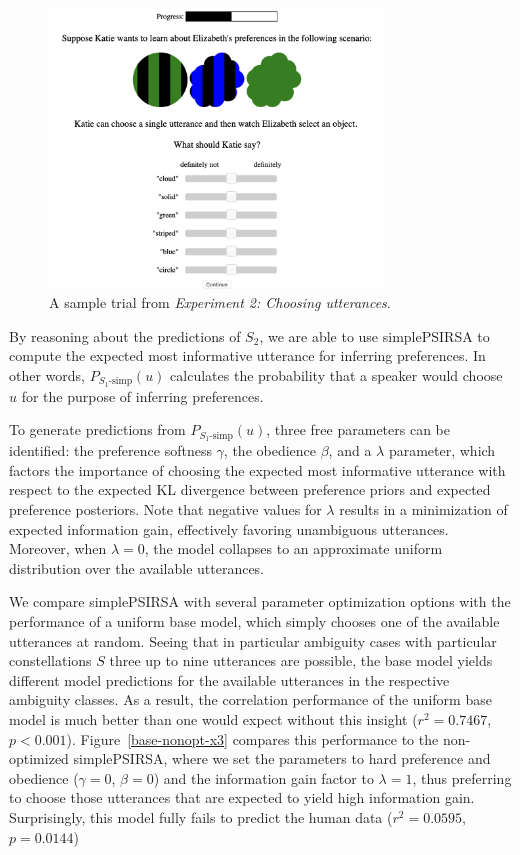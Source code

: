 \documentclass[10pt,a4paper]{article}
\newcommand{\gcs}[1]{\textcolor{blue}{[gcs: #1]}}
\begin{document}
\begin{figure}[ht]
	\centering
	\includegraphics[width=3.5in]{images/utterance-choice-trial.png}
	\caption{A sample trial from \emph{Experiment 2: Choosing utterances}. }\label{exp2-trial}
\end{figure} 

By reasoning about the predictions of $S_2$, we are able to use simplePSIRSA to compute the expected most informative utterance for inferring preferences.
In other words, $P_{S_1\textrm{-simp}}(u)$ calculates the probability that a speaker would choose $u$ for the purpose of inferring preferences.

To generate predictions from $P_{S_1\textrm{-simp}}(u)$, three free parameters can be identified:
the preference softness $\gamma$, the obedience $\beta$, and a $\lambda$ parameter, which factors the importance of choosing the expected most informative utterance with respect to the expected KL divergence between preference priors and expected preference posteriors.
Note that negative values for $\lambda$ results in a minimization of expected information gain, effectively favoring unambiguous utterances. 
Moreover, when $\lambda=0$, the model collapses to an approximate uniform distribution over the available utterances.



We compare simplePSIRSA with several parameter optimization options with the performance of a uniform base model, which simply chooses one of the available utterances at random. 
Seeing that in particular ambiguity cases with particular constellations $S$ three up to nine utterances are possible, the base model yields different model predictions for the available utterances in the respective ambiguity classes. 
As a result, the correlation performance of the uniform base model is much better than one would expect without this insight ($r^2=0.7467$, $p<0.001$).
Figure~\ref{base-nonopt-x3} compares this performance to the non-optimized simplePSIRSA, where we set the parameters to hard preference and obedience ($\gamma=0$, $\beta=0$) and the information gain factor to $\lambda=1$, thus preferring to choose those utterances that are expected to yield high information gain. 
Surprisingly, this model fully fails to predict the human data ($r^2=0.0595$, $p=0.0144$)
\end{document}

